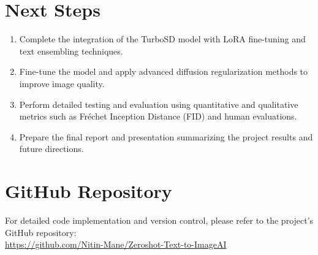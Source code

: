 \documentclass{exam}
\begin{document}
\section{Next Steps}
\begin{enumerate}
    \item Complete the integration of the TurboSD model with LoRA fine-tuning and text ensembling techniques.
    \item Fine-tune the model and apply advanced diffusion regularization methods to improve image quality.
    \item Perform detailed testing and evaluation using quantitative and qualitative metrics such as Fréchet Inception Distance (FID) and human evaluations.
    \item Prepare the final report and presentation summarizing the project results and future directions.
\end{enumerate}

\vspace{0.2in}

\section{GitHub Repository}
For detailed code implementation and version control, please refer to the project's GitHub repository: \\
\url{https://github.com/Nitin-Mane/Zeroshot-Text-to-ImageAI}
\end{document}
